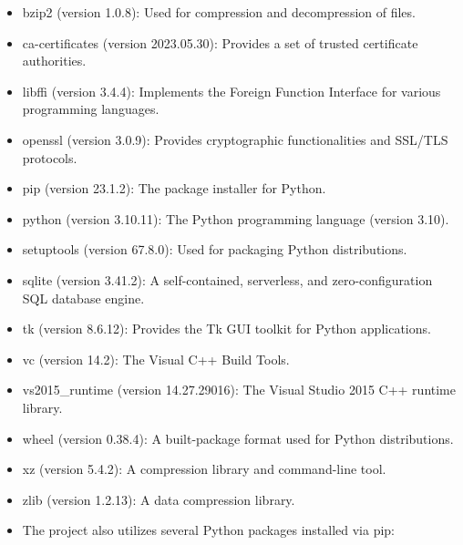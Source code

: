 	\begin{itemize}
		
		\item bzip2 (version 1.0.8): Used for compression and decompression of files.
		
		\item ca-certificates (version 2023.05.30): Provides a set of trusted certificate authorities.
		
		\item libffi (version 3.4.4): Implements the Foreign Function Interface for various programming languages.
		
		\item openssl (version 3.0.9): Provides cryptographic functionalities and SSL/TLS protocols.
		
		\item pip (version 23.1.2): The package installer for Python.
		
		\item python (version 3.10.11): The Python programming language (version 3.10).
		
		\item setuptools (version 67.8.0): Used for packaging Python distributions.
		
		\item sqlite (version 3.41.2): A self-contained, serverless, and zero-configuration SQL database engine.
		
		\item tk (version 8.6.12): Provides the Tk GUI toolkit for Python applications.
		
		\item vc (version 14.2): The Visual C++ Build Tools.
		
		\item vs2015\_runtime (version 14.27.29016): The Visual Studio 2015 C++ runtime library.
		
		\item wheel (version 0.38.4): A built-package format used for Python distributions.
		
		\item xz (version 5.4.2): A compression library and command-line tool.
		
		\item zlib (version 1.2.13): A data compression library.
		
		\item The project also utilizes several Python packages installed via pip:
		
		\begin{itemize}
			

\end{itemize}
\end{itemize}
